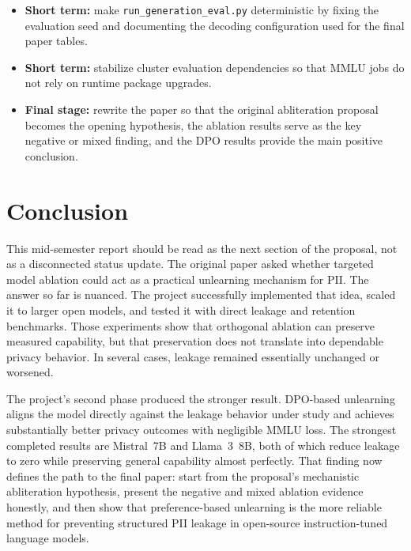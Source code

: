 \documentclass[11pt]{article}
\begin{document}
\begin{itemize}
    \item \textbf{Short term:} make \texttt{run\_generation\_eval.py} deterministic by fixing the evaluation seed and documenting the decoding configuration used for the final paper tables.
    \item \textbf{Short term:} stabilize cluster evaluation dependencies so that MMLU jobs do not rely on runtime package upgrades.
    \item \textbf{Final stage:} rewrite the paper so that the original abliteration proposal becomes the opening hypothesis, the ablation results serve as the key negative or mixed finding, and the DPO results provide the main positive conclusion.
\end{itemize}

\section{Conclusion}

This mid-semester report should be read as the next section of the proposal, not as a disconnected status update. The original paper asked whether targeted model ablation could act as a practical unlearning mechanism for PII. The answer so far is nuanced. The project successfully implemented that idea, scaled it to larger open models, and tested it with direct leakage and retention benchmarks. Those experiments show that orthogonal ablation can preserve measured capability, but that preservation does not translate into dependable privacy behavior. In several cases, leakage remained essentially unchanged or worsened.

The project's second phase produced the stronger result. DPO-based unlearning aligns the model directly against the leakage behavior under study and achieves substantially better privacy outcomes with negligible MMLU loss. The strongest completed results are Mistral~7B and Llama~3~8B, both of which reduce leakage to zero while preserving general capability almost perfectly. That finding now defines the path to the final paper: start from the proposal's mechanistic abliteration hypothesis, present the negative and mixed ablation evidence honestly, and then show that preference-based unlearning is the more reliable method for preventing structured PII leakage in open-source instruction-tuned language models.


\end{document}
